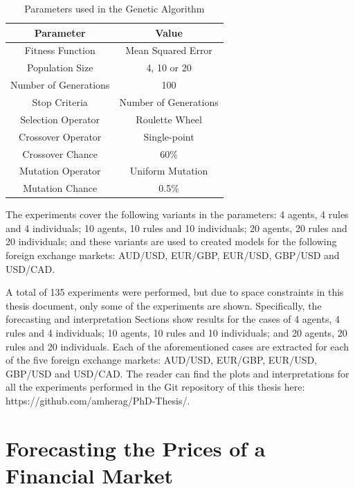 \begin{table}[ht]
\caption{Parameters used in the Genetic Algorithm}
\label{table:ga-parameters}
\centering
\begin{tabular}{|c|c|}
\hline
Parameter & Value \\
\hline
\hline
Fitness Function & Mean Squared Error \\
\hline
Population Size & 4, 10 or 20 \\
\hline
Number of Generations & 100 \\
\hline
Stop Criteria & Number of Generations \\
\hline
Selection Operator & Roulette Wheel \\
\hline
Crossover Operator & Single-point \\
\hline
Crossover Chance & 60\% \\
\hline
Mutation Operator & Uniform Mutation \\
\hline
Mutation Chance & 0.5\% \\
\hline
\end{tabular}
\end{table}

The experiments cover the following variants in the parameters: 4 agents, 4
rules and 4 individuals; 10 agents, 10 rules and 10 individuals; 20 agents, 20
rules and 20 individuals; and these variants are used to created models for the
following foreign exchange markets: AUD/USD, EUR/GBP, EUR/USD, GBP/USD and
USD/CAD.

A total of 135 experiments were performed, but due to space constraints in this
thesis document, only some of the experiments are shown. Specifically, the
forecasting and interpretation Sections show results for the cases of 4 agents,
4 rules and 4 individuals; 10 agents, 10 rules and 10 individuals; and 20
agents, 20 rules and 20 individuals. Each of the aforementioned cases are
extracted for each of the five foreign exchange markets: AUD/USD, EUR/GBP,
EUR/USD, GBP/USD and USD/CAD. The reader can find the plots and interpretations
for all the experiments performed in the Git repository of this thesis here:
https://github.com/amherag/PhD-Thesis/.

\section{Forecasting the Prices of a Financial Market}
\label{section:forecasting-the-prices-of-a-financial-market}

